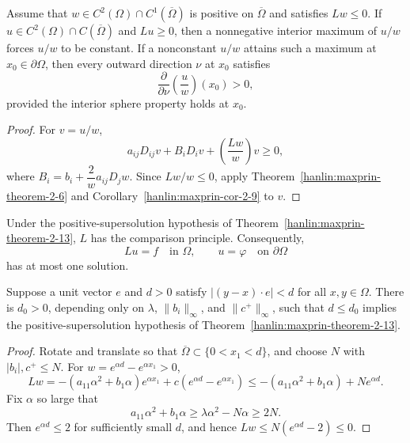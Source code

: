 \begin{theorem}\label{hanlin:maxprin-theorem-2-13}
Assume that $w\in C^2(\Omega)\cap C^1(\overline\Omega)$ is positive on
$\overline\Omega$ and satisfies $Lw\le0$. If
$u\in C^2(\Omega)\cap C(\overline\Omega)$ and $Lu\ge0$, then a nonnegative
interior maximum of $u/w$ forces $u/w$ to be constant. If a nonconstant $u/w$
attains such a maximum at $x_0\in\partial\Omega$, then every outward direction
$\nu$ at $x_0$ satisfies
\[
\frac{\partial}{\partial\nu}\left(\frac{u}{w}\right)(x_0)>0,
\]
provided the interior sphere property holds at $x_0$.
\end{theorem}
\begin{proof}
\sketch For $v=u/w$,
\[
a_{ij}D_{ij}v+B_iD_iv+\left(\frac{Lw}{w}\right)v\ge 0,
\]
where $B_i=b_i+\dfrac{2}{w}a_{ij}D_jw$. Since $Lw/w\le0$, apply
Theorem~\ref{hanlin:maxprin-theorem-2-6} and
Corollary~\ref{hanlin:maxprin-cor-2-9} to $v$.
\end{proof}

\begin{remark}\label{hanlin:maxprin-remark-2-14}
Under the positive-supersolution hypothesis of
Theorem~\ref{hanlin:maxprin-theorem-2-13}, $L$ has the comparison principle.
Consequently,
\[
Lu=f\quad\text{in }\Omega,
\qquad
u=\varphi\quad\text{on }\partial\Omega
\]
has at most one solution.
\end{remark}

\begin{proposition}\label{hanlin:maxprin-prop-2-15}
Suppose a unit vector $e$ and $d>0$ satisfy
$|(y-x)\cdot e|<d$ for all $x,y\in\Omega$. There is $d_0>0$, depending only
on $\lambda$, $\|b_i\|_\infty$, and $\|c^+\|_\infty$, such that $d\le d_0$
implies the positive-supersolution hypothesis of
Theorem~\ref{hanlin:maxprin-theorem-2-13}.
\end{proposition}
\begin{proof}
\sketch Rotate and translate so that $\overline\Omega\subset\{0<x_1<d\}$,
and choose $N$ with $|b_i|,c^+\le N$. For
$w=e^{\alpha d}-e^{\alpha x_1}>0$,
\[
Lw=-(a_{11}\alpha^2+b_1\alpha)e^{\alpha x_1}+c(e^{\alpha d}-e^{\alpha x_1})
\le -(a_{11}\alpha^2+b_1\alpha)+Ne^{\alpha d}.
\]
Fix $\alpha$ so large that
\[
a_{11}\alpha^2+b_1\alpha\ge \lambda\alpha^2-N\alpha\ge 2N.
\]
Then $e^{\alpha d}\le2$ for sufficiently small $d$, and hence
$Lw\le N(e^{\alpha d}-2)\le0$.
\end{proof}

